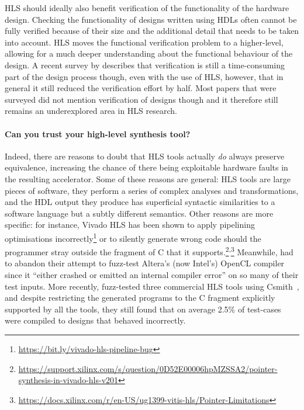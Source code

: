 \gls{HLS} should ideally also benefit verification of the functionality of the
hardware design.  Checking the functionality of designs written using
\glspl{HDL} often cannot be fully verified because of their size and the
additional detail that needs to be taken into account.  \gls{HLS} moves the
functional verification problem to a higher-level, allowing for a much deeper
understanding about the functional behaviour of the design.  A recent survey by
\textcite{lahti19_are_we_there_yet} describes that verification is still a
time-consuming part of the design process though, even with the use of
\gls{HLS}, however, that in general it still reduced the verification effort by
half.  Most papers that were surveyed did not mention verification of designs
though and it therefore still remains an underexplored area in \gls{HLS}
research.


\paragraph{Can you trust your high-level synthesis tool?}

Indeed, there are reasons to doubt that \gls{HLS} tools actually \emph{do}
always preserve equivalence, increasing the chance of there being exploitable
hardware faults in the resulting accelerator.  Some of these reasons are
general: \gls{HLS} tools are large pieces of software, they perform a series of
complex analyses and transformations, and the \gls{HDL} output they produce has
superficial syntactic similarities to a software language but a subtly different
semantics.  Other reasons are more specific: for instance, Vivado HLS has been
shown to apply pipelining optimisations
incorrectly\footnote{\url{https://bit.ly/vivado-hls-pipeline-bug}} or to silently generate wrong code should the programmer
stray outside the fragment of C that it
supports.\footnote{\url{https://support.xilinx.com/s/question/0D52E00006hpMZSSA2/pointer-synthesis-in-vivado-hls-v201}}\textsuperscript{,}\footnote{\url{https://docs.xilinx.com/r/en-US/ug1399-vitis-hls/Pointer-Limitations}}
Meanwhile, \textcite{lidbury15_many_core_compil_fuzzin} had to abandon their
attempt to fuzz-test Altera's (now Intel's) OpenCL compiler since it ``either
crashed or emitted an internal compiler error'' on so many of their test inputs.
More recently, \textcite{herklotz21_empir_study_reliab_high_level_synth_tools}
fuzz-tested three commercial \gls{HLS} tools using
Csmith~\cite{yang11_findin_under_bugs_c_compil}, and despite restricting the
generated programs to the C fragment explicitly supported by all the tools, they
still found that on average 2.5\% of test-cases were compiled to designs that
behaved incorrectly.

